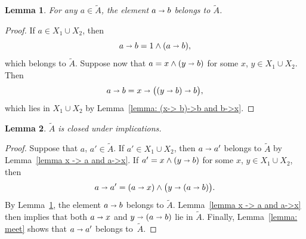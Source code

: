 \documentclass[reqno,a4paper]{amsart}
\newtheorem{lemma}{Lemma}[section]
\theoremstyle{remark}
\theoremstyle{definition}
\newcommand{\ojoin}{\cup}  %
\newcommand{\iimplies}{\shortrightarrow}
\begin{document}
\begin{lemma}\label{lemma: a-->b}
	For any \(a \in \tilde A\), the element \(a \iimplies b\) belongs to \(\tilde A\).
\end{lemma}
\begin{proof}
	If \(a \in X_1 \ojoin X_2\), then
	\[
		a \iimplies b = 1 \wedge (a \iimplies b),
	\]
	which belongs to \(\tilde A\).
	Suppose now that \(a = x \wedge (y \iimplies b)\) for some \(x\), \(y \in X_1 \ojoin X_2\).
	Then
	\[
		a \iimplies b = x \iimplies \bigl((y \iimplies b)\iimplies b\bigr),
	\]
	which lies in \(X_1 \ojoin X_2\) by Lemma~\ref{lemma: (x-> b)->b and b->x}.
\end{proof}

\begin{lemma}\label{lemma: implication}
	\(\tilde A\) is closed under implications.
\end{lemma}
\begin{proof}
	Suppose that \(a\), \(a' \in \tilde A\). If \(a' \in X_1 \ojoin X_2\), then \(a \iimplies a'\) belongs to \(\tilde A\) by Lemma~\ref{lemma x -> a and a->x}. If \(a' = x \wedge (y \iimplies b)\) for some \(x\), \(y\in X_1\ojoin X_2\), then
	\[
		a \iimplies a' = (a \iimplies x) \wedge \bigl(y \iimplies (a \iimplies b)\bigr).
	\]
	By Lemma~\ref{lemma: a-->b}, the element \(a \iimplies b\) belongs to \(\tilde A\).
	Lemma~\ref{lemma x -> a and a->x} then implies that both
	\(a \iimplies x\) and \(y \iimplies (a \iimplies b)\) lie in \(\tilde A\).
	Finally, Lemma~\ref{lemma: meet} shows that \(a \iimplies a'\) belongs to~\(\tilde A\).
\end{proof}
\end{document}
